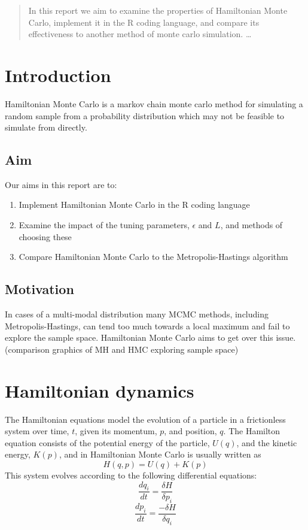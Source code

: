 \documentclass[12pt]{article}
\begin{document}
\maketitle

\begin{abstract}
In this report we aim to examine the properties of Hamiltonian Monte Carlo, implement it in the R coding language, and compare its effectiveness to another method of monte carlo simulation. \ldots
\end{abstract}

\section{Introduction}
Hamiltonian Monte Carlo is a markov chain monte carlo method for simulating a random sample from a probability distribution which may not be feasible to simulate from directly. \cite{Neal}
\subsection{Aim}
Our aims in this report are to:

\begin{enumerate}
\item Implement Hamiltonian Monte Carlo in the R coding language 
\item Examine the impact of the tuning parameters, $\epsilon$ and $L$, and methods of choosing these 
\item Compare Hamiltonian Monte Carlo to the Metropolis-Hastings algorithm
\end{enumerate}


\subsection{Motivation}
In cases of a multi-modal distribution many MCMC methods, including Metropolis-Hastings, can tend too much towards a local maximum and fail to explore the sample space. Hamiltonian Monte Carlo aims to get over this issue.
(comparison graphics of MH and HMC exploring sample space)

\section{Hamiltonian dynamics}
The Hamiltonian equations model the evolution of a particle in a frictionless system over time, $t$, given its momentum, $p$, and position, $q$. The Hamilton equation consists of the potential energy of the particle, $U(q)$, and the kinetic energy, $K(p)$, and in Hamiltonian Monte Carlo is usually written as
\begin{equation}
H(q,p) = U(q) + K(p)
\end{equation}
This system evolves according to the following differential equations:
\begin{equation}
\frac{dq_{i}}{dt} = \frac{\delta H}{\delta p_{i}}
\end{equation}
\begin{equation}
\frac{dp_{i}}{dt} = \frac{-\delta H}{\delta q_{i}}
\end{equation}
\end{document}
